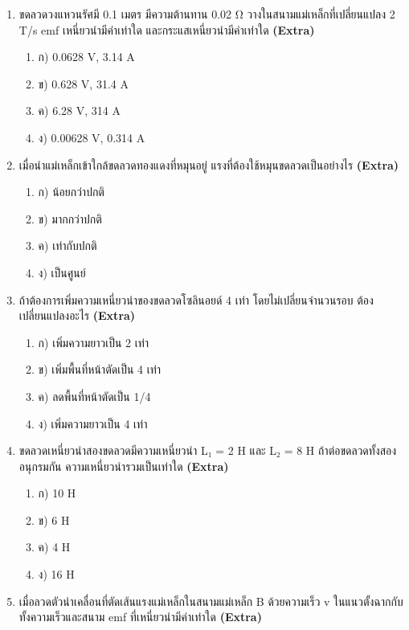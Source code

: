 \documentclass[12pt]{article}
\begin{document}
\begin{enumerate}[label=\arabic*.]
\begin{enumerate}[label=)]
\item ข) 0.5 × 10⁻³ T
\item ค) 0.5 × 10³ T
\item ง) 0.25 T
\end{enumerate}
\item ขดลวดวงแหวนรัศมี 0.1 เมตร มีความต้านทาน 0.02 Ω วางในสนามแม่เหล็กที่เปลี่ยนแปลง 2 T/s emf เหนี่ยวนำมีค่าเท่าใด และกระแสเหนี่ยวนำมีค่าเท่าใด \hfill \textbf{\small (Extra)}
\begin{enumerate}[label=)]
\item ก) 0.0628 V, 3.14 A
\item ข) 0.628 V, 31.4 A
\item ค) 6.28 V, 314 A
\item ง) 0.00628 V, 0.314 A
\end{enumerate}
\item เมื่อนำแม่เหล็กเข้าใกล้ขดลวดทองแดงที่หมุนอยู่ แรงที่ต้องใช้หมุนขดลวดเป็นอย่างไร \hfill \textbf{\small (Extra)}
\begin{enumerate}[label=)]
\item ก) น้อยกว่าปกติ
\item ข) มากกว่าปกติ
\item ค) เท่ากับปกติ
\item ง) เป็นศูนย์
\end{enumerate}
\item ถ้าต้องการเพิ่มความเหนี่ยวนำของขดลวดโซลินอยด์ 4 เท่า โดยไม่เปลี่ยนจำนวนรอบ ต้องเปลี่ยนแปลงอะไร \hfill \textbf{\small (Extra)}
\begin{enumerate}[label=)]
\item ก) เพิ่มความยาวเป็น 2 เท่า
\item ข) เพิ่มพื้นที่หน้าตัดเป็น 4 เท่า
\item ค) ลดพื้นที่หน้าตัดเป็น 1/4
\item ง) เพิ่มความยาวเป็น 4 เท่า
\end{enumerate}
\item ขดลวดเหนี่ยวนำสองขดลวดมีความเหนี่ยวนำ L₁ = 2 H และ L₂ = 8 H ถ้าต่อขดลวดทั้งสองอนุกรมกัน ความเหนี่ยวนำรวมเป็นเท่าใด \hfill \textbf{\small (Extra)}
\begin{enumerate}[label=)]
\item ก) 10 H
\item ข) 6 H
\item ค) 4 H
\item ง) 16 H
\end{enumerate}
\item เมื่อลวดตัวนำเคลื่อนที่ตัดเส้นแรงแม่เหล็กในสนามแม่เหล็ก B ด้วยความเร็ว v ในแนวตั้งฉากกับทั้งความเร็วและสนาม emf ที่เหนี่ยวนำมีค่าเท่าใด \hfill \textbf{\small (Extra)}

\end{enumerate}
\end{document}
